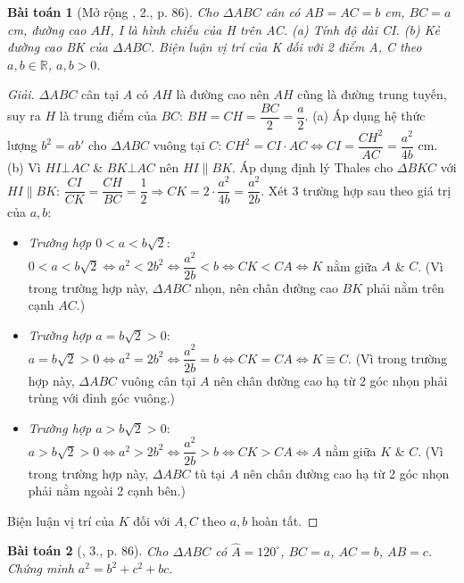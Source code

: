 \documentclass{article}
\newtheorem{baitoan}{Bài toán}
\begin{document}
\begin{baitoan}[Mở rộng \cite{Binh_Toan_9_tap_1}, 2., p. 86]
	Cho $\Delta ABC$ cân có $AB = AC = b$ {\rm cm}, $BC = a$ {\rm cm}, đường cao $AH$, I là hình chiếu của H trên AC. (a) Tính độ dài CI. (b) Kẻ đường cao BK của $\Delta ABC$. Biện luận vị trí của K đối với 2 điểm A, C theo $a,b\in\mathbb{R}$, $a,b > 0$.
\end{baitoan}

\begin{proof}[Giải]
	$\Delta ABC$ cân tại $A$ có $AH$ là đường cao nên $AH$ cũng là đường trung tuyến, suy ra $H$ là trung điểm của $BC$: $BH = CH = \dfrac{BC}{2} = \dfrac{a}{2}$. (a) Áp dụng hệ thức lượng $b^2 = ab'$ cho $\Delta ABC$ vuông tại $C$: $CH^2 = CI\cdot AC\Leftrightarrow CI = \dfrac{CH^2}{AC} = \dfrac{a^2}{4b}$ cm. (b) Vì $HI\bot AC$ \& $BK\bot AC$ nên $HI\parallel BK$. Áp dụng định lý Thales cho $\Delta BKC$ với $HI\parallel BK$: $\dfrac{CI}{CK} = \dfrac{CH}{BC} = \dfrac{1}{2}\Rightarrow CK = 2\cdot\dfrac{a^2}{4b} = \dfrac{a^2}{2b}$. Xét 3 trường hợp sau theo giá trị của $a,b$:
	\begin{itemize}
		\item \textit{Trường hợp $0 < a < b\sqrt{2}$}: $0 < a < b\sqrt{2}\Leftrightarrow a^2 < 2b^2\Leftrightarrow\dfrac{a^2}{2b} < b\Leftrightarrow CK < CA\Leftrightarrow K$ nằm giữa $A$ \& $C$. (Vì trong trường hợp này, $\Delta ABC$ nhọn, nên chân đường cao $BK$ phải nằm trên cạnh $AC$.)
		\item \textit{Trường hợp $a = b\sqrt{2} > 0$}: $a = b\sqrt{2} > 0\Leftrightarrow a^2 = 2b^2\Leftrightarrow\dfrac{a^2}{2b} = b\Leftrightarrow CK = CA\Leftrightarrow K\equiv C$. (Vì trong trường hợp này, $\Delta ABC$ vuông cân tại $A$ nên chân đường cao hạ từ 2 góc nhọn phải trùng với đỉnh góc vuông.)
		\item \textit{Trường hợp $a > b\sqrt{2} > 0$}: $a > b\sqrt{2} > 0\Leftrightarrow a^2 > 2b^2\Leftrightarrow\dfrac{a^2}{2b} > b\Leftrightarrow CK > CA\Leftrightarrow A$ nằm giữa $K$ \& $C$. (Vì trong trường hợp này, $\Delta ABC$ tù tại $A$ nên chân đường cao hạ từ 2 góc nhọn phải nằm ngoài 2 cạnh bên.)
	\end{itemize}
	Biện luận vị trí của $K$ đối với $A,C$ theo $a,b$ hoàn tất.
\end{proof}

\begin{baitoan}[\cite{Binh_Toan_9_tap_1}, 3., p. 86]
	Cho $\Delta ABC$ có $\widehat{A} = 120^\circ$, $BC = a$, $AC = b$, $AB = c$. Chứng minh $a^2 = b^2 + c^2 + bc$.
\end{baitoan}
\end{document}

